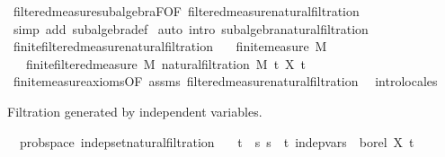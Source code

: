 \begin{isabellebody}
\ filtered{\isacharunderscore}{\kern0pt}measure{\isachardot}{\kern0pt}subalgebra{\isacharunderscore}{\kern0pt}F{\isacharbrackleft}{\kern0pt}OF\ filtered{\isacharunderscore}{\kern0pt}measure{\isacharunderscore}{\kern0pt}natural{\isacharunderscore}{\kern0pt}filtration{\isacharbrackright}{\kern0pt}\ \isamarkupfalse%
\ {\isacharparenleft}{\kern0pt}simp\ add{\isacharcolon}{\kern0pt}\ subalgebra{\isacharunderscore}{\kern0pt}def{\isacharparenright}{\kern0pt}\isanewline
{}\isamarkupfalse%
\ {\isacharparenleft}{\kern0pt}auto\ intro{\isacharcolon}{\kern0pt}\ subalgebra{\isacharunderscore}{\kern0pt}natural{\isacharunderscore}{\kern0pt}filtration{\isacharparenright}{\kern0pt}%
\endisatagproof
{\isafoldproof}%
%
\isadelimproof
\isanewline
%
\endisadelimproof
\isanewline
{}\isamarkupfalse%
\ finite{\isacharunderscore}{\kern0pt}filtered{\isacharunderscore}{\kern0pt}measure{\isacharunderscore}{\kern0pt}natural{\isacharunderscore}{\kern0pt}filtration{\isacharcolon}{\kern0pt}\isanewline
\ \ \ {\isachardoublequoteopen}finite{\isacharunderscore}{\kern0pt}measure\ M{\isachardoublequoteclose}\isanewline
\ \ \ {\isachardoublequoteopen}finite{\isacharunderscore}{\kern0pt}filtered{\isacharunderscore}{\kern0pt}measure\ M\ {\isacharparenleft}{\kern0pt}natural{\isacharunderscore}{\kern0pt}filtration\ M\ t\ X{\isacharparenright}{\kern0pt}\ t\ \isanewline
%
\isadelimproof
\ \ %
\endisadelimproof
%
\isatagproof
{}\isamarkupfalse%
\ finite{\isacharunderscore}{\kern0pt}measure{\isachardot}{\kern0pt}axioms{\isacharbrackleft}{\kern0pt}OF\ assms{\isacharbrackright}{\kern0pt}\ filtered{\isacharunderscore}{\kern0pt}measure{\isacharunderscore}{\kern0pt}natural{\isacharunderscore}{\kern0pt}filtration\ \isamarkupfalse%
\ intro{\isacharunderscore}{\kern0pt}locales%
\endisatagproof
{\isafoldproof}%
%
\isadelimproof
\isanewline
%
\endisadelimproof
\isanewline
{}\isamarkupfalse%
%
\begin{isamarkuptext}%
Filtration generated by independent variables.%
\end{isamarkuptext}\isamarkuptrue%
\isamarkupfalse%
\ {\isacharparenleft}{\kern0pt}\ prob{\isacharunderscore}{\kern0pt}space{\isacharparenright}{\kern0pt}\ indep{\isacharunderscore}{\kern0pt}set{\isacharunderscore}{\kern0pt}natural{\isacharunderscore}{\kern0pt}filtration{\isacharcolon}{\kern0pt}\isanewline
\ \ \ {\isachardoublequoteopen}t\ {\isasymle}\ s{\isachardoublequoteclose}\ {\isachardoublequoteopen}s\ {\isacharless}{\kern0pt}\ t{\isachardoublequoteclose}\ {\isachardoublequoteopen}indep{\isacharunderscore}{\kern0pt}vars\ {\isacharparenleft}{\kern0pt}{\isasymlambda}{\isacharunderscore}{\kern0pt}{\isachardot}{\kern0pt}\ borel{\isacharparenright}{\kern0pt}\ X\ {\isacharbraceleft}{\kern0pt}t\isanewline

\end{isabellebody}
